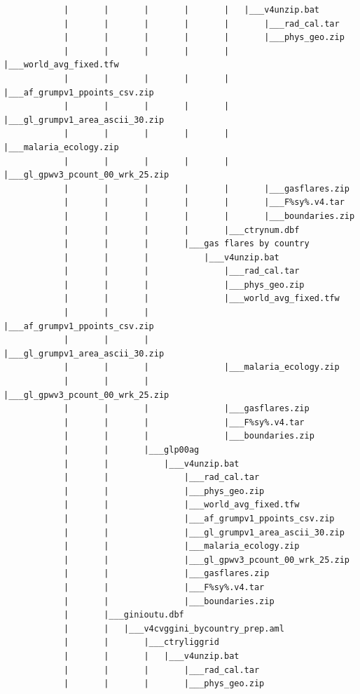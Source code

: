 \documentclass[]{book}
\begin{document}
\begin{verbatim}
            |       |       |       |       |   |___v4unzip.bat
            |       |       |       |       |       |___rad_cal.tar
            |       |       |       |       |       |___phys_geo.zip
            |       |       |       |       |       |___world_avg_fixed.tfw
            |       |       |       |       |       |___af_grumpv1_ppoints_csv.zip
            |       |       |       |       |       |___gl_grumpv1_area_ascii_30.zip
            |       |       |       |       |       |___malaria_ecology.zip
            |       |       |       |       |       |___gl_gpwv3_pcount_00_wrk_25.zip
            |       |       |       |       |       |___gasflares.zip
            |       |       |       |       |       |___F%sy%.v4.tar
            |       |       |       |       |       |___boundaries.zip
            |       |       |       |       |___ctrynum.dbf
            |       |       |       |___gas flares by country
            |       |       |           |___v4unzip.bat
            |       |       |               |___rad_cal.tar
            |       |       |               |___phys_geo.zip
            |       |       |               |___world_avg_fixed.tfw
            |       |       |               |___af_grumpv1_ppoints_csv.zip
            |       |       |               |___gl_grumpv1_area_ascii_30.zip
            |       |       |               |___malaria_ecology.zip
            |       |       |               |___gl_gpwv3_pcount_00_wrk_25.zip
            |       |       |               |___gasflares.zip
            |       |       |               |___F%sy%.v4.tar
            |       |       |               |___boundaries.zip
            |       |       |___glp00ag
            |       |           |___v4unzip.bat
            |       |               |___rad_cal.tar
            |       |               |___phys_geo.zip
            |       |               |___world_avg_fixed.tfw
            |       |               |___af_grumpv1_ppoints_csv.zip
            |       |               |___gl_grumpv1_area_ascii_30.zip
            |       |               |___malaria_ecology.zip
            |       |               |___gl_gpwv3_pcount_00_wrk_25.zip
            |       |               |___gasflares.zip
            |       |               |___F%sy%.v4.tar
            |       |               |___boundaries.zip
            |       |___ginioutu.dbf
            |       |   |___v4cvggini_bycountry_prep.aml
            |       |       |___ctryliggrid
            |       |       |   |___v4unzip.bat
            |       |       |       |___rad_cal.tar
            |       |       |       |___phys_geo.zip

\end{verbatim}
\end{document}
